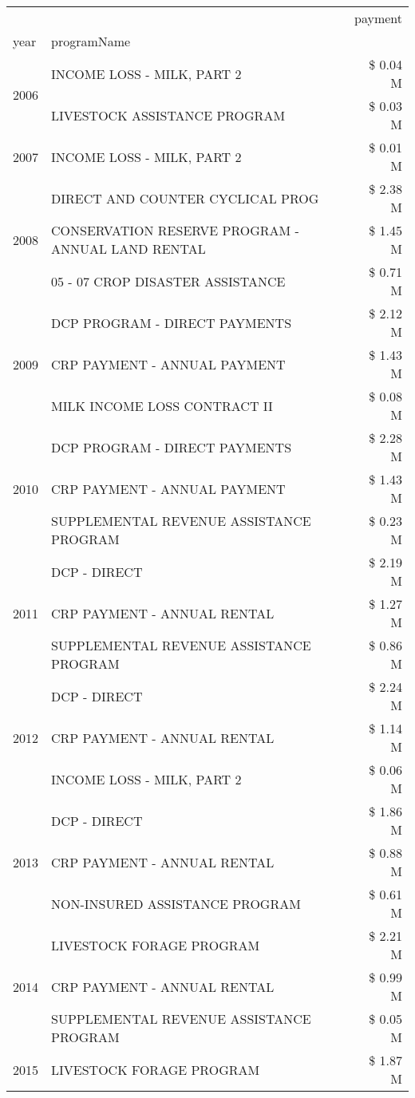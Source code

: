\begin{tabular}{llr}
\toprule
 &  & payment \\
year & programName &  \\
\midrule
\multirow[t]{2}{*}{2006} & INCOME LOSS - MILK, PART 2 & \$ 0.04 M \\
 & LIVESTOCK ASSISTANCE PROGRAM & \$ 0.03 M \\
\cline{1-3}
2007 & INCOME LOSS - MILK, PART 2 & \$ 0.01 M \\
\cline{1-3}
\multirow[t]{3}{*}{2008} & DIRECT AND COUNTER CYCLICAL PROG & \$ 2.38 M \\
 & CONSERVATION RESERVE PROGRAM - ANNUAL LAND RENTAL & \$ 1.45 M \\
 & 05 - 07 CROP DISASTER ASSISTANCE & \$ 0.71 M \\
\cline{1-3}
\multirow[t]{3}{*}{2009} & DCP PROGRAM - DIRECT PAYMENTS & \$ 2.12 M \\
 & CRP PAYMENT - ANNUAL PAYMENT & \$ 1.43 M \\
 & MILK INCOME LOSS CONTRACT II & \$ 0.08 M \\
\cline{1-3}
\multirow[t]{3}{*}{2010} & DCP PROGRAM - DIRECT PAYMENTS & \$ 2.28 M \\
 & CRP PAYMENT - ANNUAL PAYMENT & \$ 1.43 M \\
 & SUPPLEMENTAL REVENUE ASSISTANCE PROGRAM & \$ 0.23 M \\
\cline{1-3}
\multirow[t]{3}{*}{2011} & DCP - DIRECT & \$ 2.19 M \\
 & CRP PAYMENT - ANNUAL RENTAL & \$ 1.27 M \\
 & SUPPLEMENTAL REVENUE ASSISTANCE PROGRAM & \$ 0.86 M \\
\cline{1-3}
\multirow[t]{3}{*}{2012} & DCP - DIRECT & \$ 2.24 M \\
 & CRP PAYMENT - ANNUAL RENTAL & \$ 1.14 M \\
 & INCOME LOSS - MILK, PART 2 & \$ 0.06 M \\
\cline{1-3}
\multirow[t]{3}{*}{2013} & DCP - DIRECT & \$ 1.86 M \\
 & CRP PAYMENT - ANNUAL RENTAL & \$ 0.88 M \\
 & NON-INSURED ASSISTANCE PROGRAM & \$ 0.61 M \\
\cline{1-3}
\multirow[t]{3}{*}{2014} & LIVESTOCK FORAGE PROGRAM & \$ 2.21 M \\
 & CRP PAYMENT - ANNUAL RENTAL & \$ 0.99 M \\
 & SUPPLEMENTAL REVENUE ASSISTANCE PROGRAM & \$ 0.05 M \\
\cline{1-3}
\multirow[t]{3}{*}{2015} & LIVESTOCK FORAGE PROGRAM & \$ 1.87 M \\

\end{tabular}
